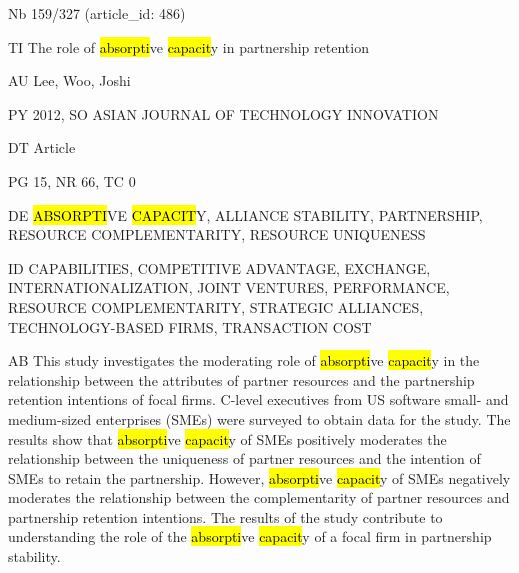 \documentclass[a4paper]{article}
\begin{document}
\vspace*{-2cm}
Nb \tabto{0cm}159/327 (article\_id: 486)\par
TI \tabto{0cm}The role of \hl{absorpti}ve \hl{capacit}y in partnership retention\par
AU \tabto{0cm}Lee, Woo, Joshi\par
PY \tabto{0cm}2012, SO ASIAN JOURNAL OF TECHNOLOGY INNOVATION\par
DT \tabto{0cm}Article\par
PG \tabto{0cm}15, NR 66, TC 0\par
DE \tabto{0cm}\hl{ABSORPTI}VE \hl{CAPACIT}Y, ALLIANCE STABILITY, PARTNERSHIP, RESOURCE COMPLEMENTARITY, RESOURCE UNIQUENESS\par
ID \tabto{0cm}CAPABILITIES, COMPETITIVE ADVANTAGE, EXCHANGE, INTERNATIONALIZATION, JOINT VENTURES, PERFORMANCE, RESOURCE COMPLEMENTARITY, STRATEGIC ALLIANCES, TECHNOLOGY-BASED FIRMS, TRANSACTION COST\par
AB \tabto{0cm}This study investigates the moderating role of \hl{absorpti}ve \hl{capacit}y in the relationship between the attributes of partner resources and the partnership retention intentions of focal firms. C-level executives from US software small- and medium-sized enterprises (SMEs) were surveyed to obtain data for the study. The results show that \hl{absorpti}ve \hl{capacit}y of SMEs positively moderates the relationship between the uniqueness of partner resources and the intention of SMEs to retain the partnership. However, \hl{absorpti}ve \hl{capacit}y of SMEs negatively moderates the relationship between the complementarity of partner resources and partnership retention intentions. The results of the study contribute to understanding the role of the \hl{absorpti}ve \hl{capacit}y of a focal firm in partnership stability.\par
\clearpage
\end{document}
